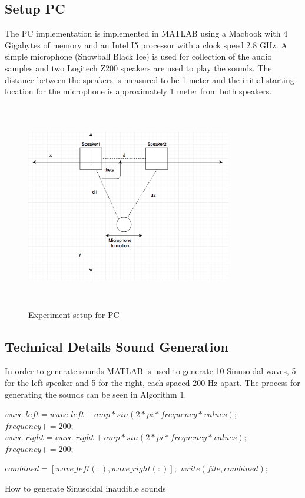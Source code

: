 \documentclass{acm_proc_article-sp}
\begin{document}
\subsection{Setup PC}
The PC implementation is implemented in MATLAB using a Macbook with 4 Gigabytes of memory and an Intel I5 processor with a clock speed 2.8 GHz. A simple microphone (Snowball Black Ice) is used for collection of the audio samples and two Logitech Z200 speakers are used to play the sounds. The distance between the speakers is measured to be 1 meter and the initial starting location for the microphone is approximately 1 meter from both speakers.

\begin{figure}[h]
\caption{Experiment setup for PC}
\includegraphics[width=9cm, height=9cm]{PCSetup}
\end{figure}

\subsection{Technical Details Sound Generation} \label{technical_details Sound Mixing}
In order to generate sounds MATLAB is used to generate 10 Sinusoidal waves, 5 for the left speaker and 5 for the right, each spaced 200 Hz apart. The process for generating the sounds can be seen in Algorithm 1.

\begin{algorithm}
\setlength{\parindent}{0cm}
{$wave\_left = wave\_left + amp*sin(2*pi*frequency*values);$
$frequency += 200;$}
{$wave\_right = wave\_right + amp*sin(2*pi*frequency*values);$
$frequency += 200;$}

$
combined = [wave\_left(:), wave\_right(:)];
$
$write(file, combined);$

\caption{How to generate Sinusoidal inaudible sounds}
\end{algorithm}
\end{document}
